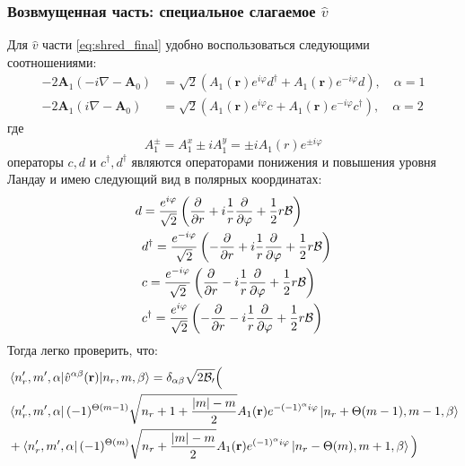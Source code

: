 \documentclass[a4paper,article,14pt]{extarticle}
\begin{document}
\subsubsection{Возвмущенная часть: специальное слагаемое $\hat v$}
Для  $\hat v$ части \eqref{eq:shred_final} удобно воспользоваться следующими соотношениями:
\begin{equation}
\begin{aligned}
-2 \mathbf{A}_1  (-i \nabla - \mathbf{A}_0 )& = \sqrt{2} \left( A_{1} (\mathbf{r}) e^{ i \varphi  } d^{\dagger} +  A_{1} (\mathbf{r}) e^{-i \varphi  } d \right), \quad \alpha = 1 \\
-2 \mathbf{A}_1  (i \nabla - \mathbf{A}_0 ) & = \sqrt{2} \left( A_{1} (\mathbf{r}) e^{  i \varphi  } c^{} +  A_{1} (\mathbf{r}) e^{-i \varphi  } c^{\dagger} \right) , \quad \alpha = 2
\end{aligned}
\end{equation}
где 
$$
A^{\pm}_{1}   = A_{1}^{x} \pm i A_{1}^{y} = \pm i A_1 (r) e^{ \pm i \varphi  } 
$$
операторы $c,d$ и $c^{\dagger},d^{\dagger} $ являются операторами понижения и повышения уровня Ландау и имею следующий вид в полярных координатах:
\begin{equation}
\begin{aligned}
d &= \frac{e^{i \varphi}} {\sqrt{2}} \left(  \frac {\partial }{\partial r} + i \frac{1}{r}  \frac {\partial }{\partial \varphi} + \frac 1 2   r \cal B  \right) \\
&d^{\dagger} = \frac{e^{ -i \varphi}} {\sqrt{2}} \left(  - \frac {\partial }{\partial r} + i \frac{1}{r}  \frac {\partial }{\partial \varphi} + \frac 1 2    r \cal B \right) \\
&c = \frac{e^{- i \varphi}} {\sqrt{2}} \left(  \frac {\partial }{\partial r} - i \frac{1}{r}  \frac {\partial }{\partial \varphi} + \frac 1 2   r \cal B  \right) \\
&c^{\dagger} = \frac{e^{ i \varphi}} {\sqrt{2}} \left(  - \frac {\partial }{\partial r} - i \frac{1}{r}  \frac {\partial }{\partial \varphi} + \frac 1 2    r \cal B \right) \\
\end{aligned}
\end{equation}
Тогда легко проверить, что:
\begin{equation}
\begin{aligned}
&\mel{n_r',m',\alpha} {\hat v^{\alpha \beta}(\mathbf{r}) }{n_r, m,\beta} =
 \delta_{\alpha \beta} \sqrt{ {2\cal{B}_0} } \Big( \\
&\bra{n_r',m',\alpha} (-1)^{\Theta(m-1)}  \sqrt{n_r + 1 + \frac{|m| - m}{2}  }  A_{1} (\mathbf{r}) e^{ -(-1)^{\alpha} i \varphi}   \ket{n_r+\Theta(m-1), m-1,\beta}  \\
&+ \bra{n_r',m',\alpha} (-1)^{\Theta(m)} \sqrt{  n_r + \frac{|m| - m}{2}  }  A_{1} (\mathbf{r}) e^{(-1)^\alpha i \varphi} \ket{n_r-\Theta(m), m +1 ,\beta}   \Big) \\
\end{aligned}
\end{equation}
\end{document}
